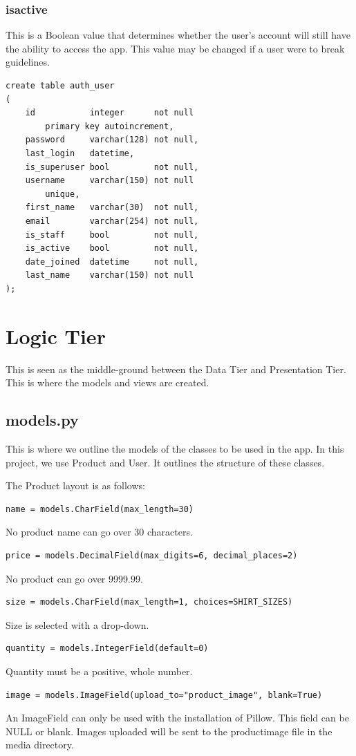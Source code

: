 \subsubsection{is\textunderscore active}
This is a Boolean value that determines whether the user's account will still have the ability to access the app. This value may be changed if a user were to break guidelines.
\begin{verbatim}
create table auth_user
(
    id           integer      not null
        primary key autoincrement,
    password     varchar(128) not null,
    last_login   datetime,
    is_superuser bool         not null,
    username     varchar(150) not null
        unique,
    first_name   varchar(30)  not null,
    email        varchar(254) not null,
    is_staff     bool         not null,
    is_active    bool         not null,
    date_joined  datetime     not null,
    last_name    varchar(150) not null
);
\end{verbatim}

\section{Logic Tier}
This is seen as the middle-ground between the Data Tier and Presentation Tier. This is where the models and views are created.
\subsection{models.py}
This is where we outline the models of the classes to be used in the app. In this project, we use Product and User. It outlines the structure of these classes.

The Product layout is as follows:
\begin{verbatim}name = models.CharField(max_length=30)\end{verbatim}
No product name can go over 30 characters.
\begin{verbatim}price = models.DecimalField(max_digits=6, decimal_places=2)\end{verbatim}
No product can go over 9999.99.
\begin{verbatim}size = models.CharField(max_length=1, choices=SHIRT_SIZES)\end{verbatim}
Size is selected with a drop-down.
\begin{verbatim}quantity = models.IntegerField(default=0)\end{verbatim}
Quantity must be a positive, whole number.
\begin{verbatim}image = models.ImageField(upload_to="product_image", blank=True)\end{verbatim}
An ImageField can only be used with the installation of Pillow. This field can be NULL or blank. Images uploaded will be sent to the product\textunderscore image file in the media directory.

